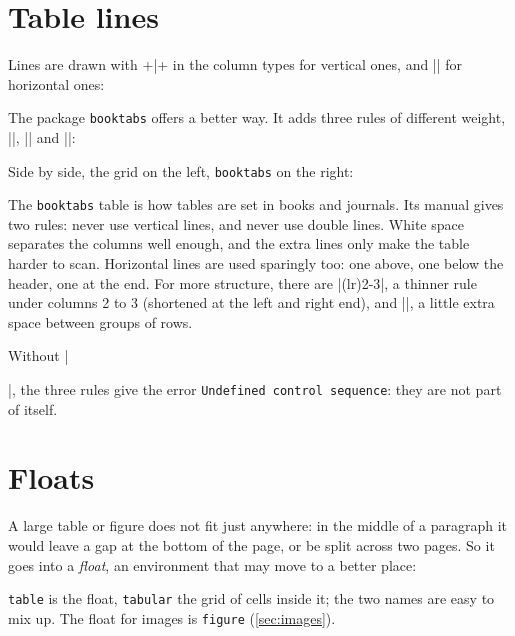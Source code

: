 
\section{Table lines}\label{sec:table-lines}

Lines are drawn with \code+|+ in the column types for vertical ones, and \code|\hline| for horizontal ones:


The package \texttt{booktabs} offers a better way.
It adds three rules of different weight, \code|\toprule|, \code|\midrule| and \code|\bottomrule|:


Side by side, the grid on the left, \texttt{booktabs} on the right:


The \texttt{booktabs} table is how tables are set in books and journals.
Its manual \parencite{fear2020} gives two rules:
never use vertical lines, and never use double lines.
White space separates the columns well enough,
and the extra lines only make the table harder to scan.
Horizontal lines are used sparingly too: one above, one below the header, one at the end.
For more structure, there are
\code|\cmidrule(lr){2-3}|, a thinner rule under columns 2 to 3 (shortened at the left and right end),
and \code|\addlinespace|, a little extra space between groups of rows.

Without \code|\usepackage{booktabs}|, the three rules give the error \texttt{Undefined control sequence}:
they are not part of  itself.

\section{Floats}\label{sec:floats}

A large table or figure does not fit just anywhere:
in the middle of a paragraph it would leave a gap at the bottom of the page,
or be split across two pages.
So it goes into a \emph{float}, an environment that  may move to a better place:


\texttt{table} is the float, \texttt{tabular} the grid of cells inside it;
the two names are easy to mix up.
The float for images is \texttt{figure} (\autoref{sec:images}).

